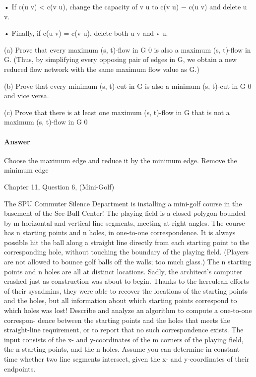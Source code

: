 \documentclass{article}
\begin{document}
• If c(u  v) < c(v  u), change the capacity of v  u to c(v  u) − c(u  v)
and delete u  v.

• Finally, if c(u  v) = c(v  u), delete both u  v and v  u.

(a) Prove that every maximum (s, t)-flow in G 0 is also a maximum (s, t)-flow
in G. (Thus, by simplifying every opposing pair of edges in G, we obtain
a new reduced flow network with the same maximum flow value as G.)

(b) Prove that every minimum (s, t)-cut in G is also a minimum (s, t)-cut
in G 0 and vice versa.

(c) Prove that there is at least one maximum (s, t)-flow in G that is not a
maximum (s, t)-flow in G 0

\paragraph{Answer}

Choose the maximum edge and reduce it by the minimum edge. Remove the minimum edge


\collab{\todo{}}
\nextprob{}

Chapter 11, Question 6, (Mini-Golf)

The SPU Commuter Silence Department is installing a mini-golf course in
the basement of the See-Bull Center! The playing field is a closed polygon
bounded by m horizontal and vertical line segments, meeting at right angles.
The course has n starting points and n holes, in one-to-one correspondence.
It is always possible hit the ball along a straight line directly from each
starting point to the corresponding hole, without touching the boundary
of the playing field. (Players are not allowed to bounce golf balls off the
walls; too much glass.) The n starting points and n holes are all at distinct
locations.
Sadly, the architect’s computer crashed just as construction was about to
begin. Thanks to the herculean efforts of their sysadmins, they were able to
recover the locations of the starting points and the holes, but all information
about which starting points correspond to which holes was lost!
Describe and analyze an algorithm to compute a one-to-one correspon-
dence between the starting points and the holes that meets the straight-line
requirement, or to report that no such correspondence exists. The input
consists of the x- and y-coordinates of the m corners of the playing field, the
n starting points, and the n holes. Assume you can determine in constant
time whether two line segments intersect, given the x- and y-coordinates
of their endpoints.
\end{document}
